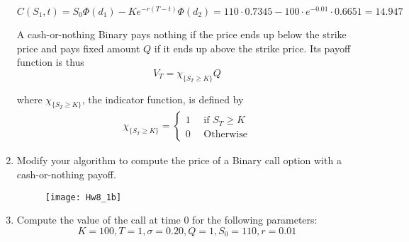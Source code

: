 \documentclass[12pt,twoside, letter]{exam}
\theoremstyle{definition}
\begin{document}
\begin{enumerate}
\begin{solution}
          $C(S_1, t) = S_0 \Phi(d_1) - Ke^{-r(T-t)} \Phi(d_2) = 110\cdot 0.7345 - 100\cdot e^{-0.01} \cdot 0.6651 = 14.947$
        \end{solution}
  \par{A cash-or-nothing Binary pays nothing if the price ends up below the strike price and pays fixed amount $Q$ if it ends
    up above the strike price. Its payoff function is thus}
    \begin{equation*}
      V_T = \chi_{\{S_T \geq K \}} Q
    \end{equation*}
  \par{where $\chi_{\{S_T \geq K \}}$, the indicator function, is defined by }
    \begin{align*}
      \chi_{\{S_T \geq K \}} =
      \begin{cases}
        1 \quad \text{ if $S_T \geq K$} \\
        0 \quad \text{ Otherwise}
      \end{cases}
    \end{align*}

    \item Modify your algorithm to compute the price of a Binary call option with a cash-or-nothing payoff.
        \begin{solution}
          \begin{figure}[H]
            \centering
              \texttt{[image: Hw8\_1b]}
          \end{figure}
        \end{solution}
    \item Compute the value of the call at time 0 for the following parameters:
      \begin{equation*}
        K = 100, T = 1, \sigma = 0.20, Q = 1, S_0 = 110, r = 0.01
      \end{equation*}


\end{enumerate}
\end{document}
